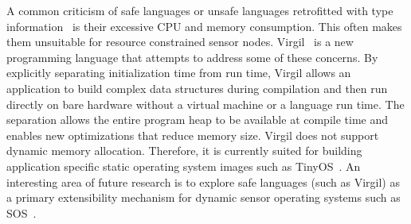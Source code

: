 A common criticism of safe languages or unsafe languages retrofitted
with type information~\cite{ccured02necula} is their excessive CPU and
memory consumption.
%
This often makes them unsuitable for resource constrained sensor
nodes.
%
Virgil~\cite{titzer06virgil} is a new programming language that
attempts to address some of these concerns.
%
By explicitly separating initialization time from run time, Virgil
allows an application to build complex data structures during
compilation and then run directly on bare hardware without a virtual
machine or a language run time.
%
The separation allows the entire program heap to be available at
compile time and enables new optimizations that reduce memory size.
%
Virgil does not support dynamic memory allocation.
%
Therefore, it is currently suited for building application specific
static operating system images such as TinyOS~\cite{levis05t2}.
%
An interesting area of future research is to explore safe languages
(such as Virgil) as a primary extensibility mechanism for dynamic
sensor operating systems such as SOS~\cite{ram05sos}.
%

